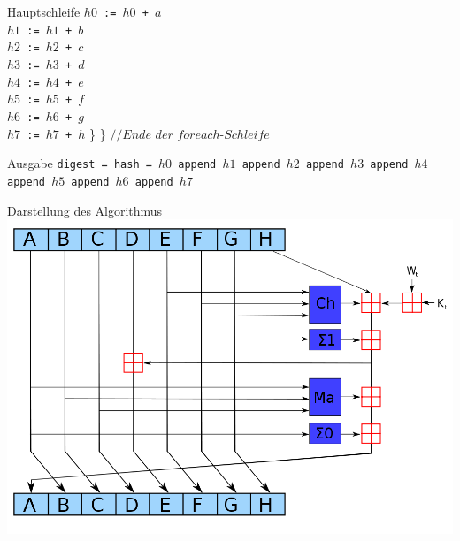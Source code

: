 \documentclass[xcolor=x11names,compress]{beamer}
\renewcommand{\(}{\begin{columns}}
\renewcommand{\)}{\end{columns}}
\newcommand{\<}[1]{\begin{column}{#1}}
\renewcommand{\>}{\end{column}}
\begin{document}
\begin{frame}{Hauptschleife}
\texttt{$h0$ := $h0$ + $a$ \\
    $h1$ := $h1$ + $b$ \\
    $h2$ := $h2$ + $c$ \\
    $h3$ := $h3$ + $d$ \\
    $h4$ := $h4$ + $e$ \\
    $h5$ := $h5$ + $f$ \\
    $h6$ := $h6$ + $g$ \\
    $h7$ := $h7$ + $h$} \newline \} \newline \} $//Ende$ $der$ $foreach$-$Schleife$
\end{frame}

\begin{frame}{Ausgabe}
\texttt{digest = hash = $h0$ append $h1$ append $h2$ append $h3$ append $h4$ append $h5$ append $h6$ append $h7$}
\end{frame}
\begin{frame}{Darstellung des Algorithmus}
\includegraphics[scale=0.3]{sha256.png}\\
\end{frame}
\end{document}
